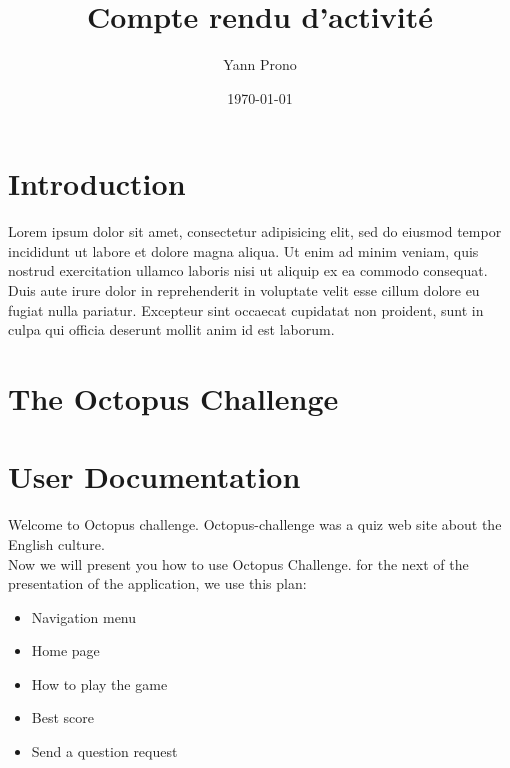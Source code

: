 \documentclass[a4paper,11pt, oneside]{book}
\title{Compte rendu d'activité}
\author{Yann Prono}
\date{\today}
\def\appName{The Octopus Challenge}
\begin{document}
	\begin{titlepage}
		
	\end{titlepage}


	\newpage

	\newpage\null\thispagestyle{empty}\newpage
	\setcounter{page}{1}
	\tableofcontents

	\chapter{Introduction}
	Lorem ipsum dolor sit amet, consectetur adipisicing elit, sed do eiusmod tempor incididunt ut labore et dolore magna aliqua. Ut enim ad minim veniam, quis nostrud exercitation ullamco laboris nisi ut aliquip ex ea commodo consequat. Duis aute irure dolor in reprehenderit in voluptate velit esse cillum dolore eu fugiat nulla pariatur. Excepteur sint occaecat cupidatat non proident, sunt in culpa qui officia deserunt mollit anim id est laborum.
	\clearpage

	\chapter{\appName}
	\clearpage

	\chapter{User Documentation}
	Welcome to Octopus challenge.
	Octopus-challenge was a quiz web site about the English culture.\\
	Now we will present you how to use Octopus Challenge.
	for the next of the presentation of the application, we use this plan:
	\begin{itemize}
		\item Navigation menu
		\item Home page
		\item How to play the game
		\item Best score
		\item Send a question request\\
	\end{itemize}
\end{document}
